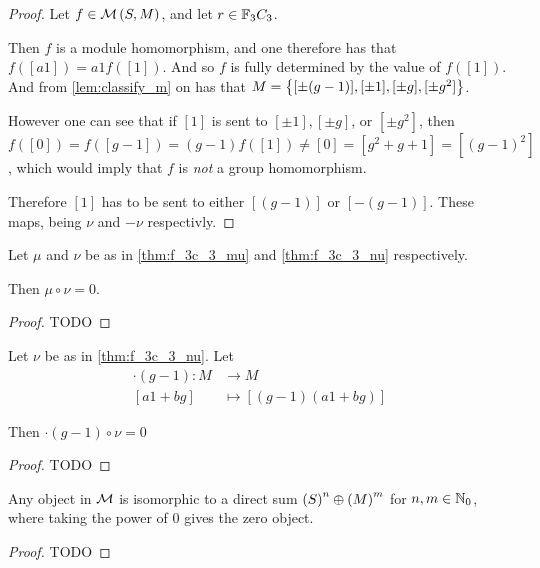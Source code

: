 \begin{proof}
    Let \( f \in {\mathcal{M}}\left( S, M \right) \), and let \( r \in {\mathbb{F}}_3C_3 \).
    
    Then \( f \) is a module homomorphism, and one therefore has that \( f([a1]) = a1 f([1]) \). And so \( f \) is fully determined by the value of \( f([1]) \). And from \autoref{lem:classify_m} on has that \( M = \left\{ [\pm (g - 1)], [\pm 1], [\pm g], [\pm g^2] \right\} \).

    However one can see that if \( [1] \) is sent to \( [\pm 1], [\pm g] \), or \( [\pm g^2] \), then \( f([0]) = f([g - 1]) = (g - 1)f([1]) \neq [0] = [g^2 + g + 1] = [(g - 1)^2] \), which would imply that \( f \) is \emph{not} a group homomorphism.

    Therefore \( [1] \) has to be sent to either \( [(g - 1)] \) or \( [-(g - 1)] \). These maps, being \( \nu \) and \( -\nu \) respectivly.
\end{proof}

\begin{lemma} \label{thm:f_3c_3_mu_circ_nu_zero}
    Let \( \mu \) and \( \nu \) be as in \autoref{thm:f_3c_3_mu} and \autoref{thm:f_3c_3_nu} respectively.

    Then \( \mu \circ \nu = 0 \).
\end{lemma}
\begin{proof}
    TODO
\end{proof}

\begin{lemma} \label{lem:g-1_circ_nu_equals_zero}
    Let \( \nu \) be as in \autoref{thm:f_3c_3_nu}. Let
    \begin{align*}
        \cdot(g - 1): M &\to M \\
        [a1 + bg] &\mapsto [(g - 1)(a1 + bg)]
    \end{align*}

    Then \( \cdot(g - 1) \circ \nu = 0 \) 
\end{lemma}
\begin{proof}
    TODO
\end{proof}

\begin{lemma} \label{thm:f_3c_3_decomposition}
    Any object in \( {\mathcal{M}} \) is isomorphic to a direct sum \( \left(  S  \right)^n \oplus \left(  M  \right)^m \) for \( n, m \in {\mathbb{N}}_0 \), where taking the power of \( 0 \) gives the zero object. \sloppy
\end{lemma}
\begin{proof}
    TODO
\end{proof}

